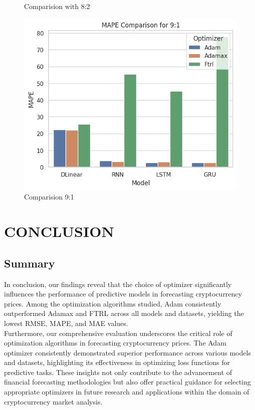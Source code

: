 \documentclass{ieeeojies}
\begin{document}
\begin{figure}[H]
\begin{minipage}{0.15\textwidth}
    \caption{Comparision with 8:2}
    \label{fig:2}
    \end{minipage}
    \hfill
    \begin{minipage}{0.15\textwidth}
    \centering
    \includegraphics[width=1\textwidth]{image/MAPE_91_eth.png}
    \caption{Comparision 9:1}
    \label{fig:1}
    \end{minipage}
\end{figure}

\section{CONCLUSION}


\subsection{Summary}
\par In conclusion, our findings reveal that the choice of optimizer significantly influences the performance of predictive models in forecasting cryptocurrency prices. Among the optimization algorithms studied, Adam consistently outperformed Adamax and FTRL across all models and datasets, yielding the lowest RMSE, MAPE, and MAE values.
\\
Furthermore, our comprehensive evaluation underscores the critical role of optimization algorithms in forecasting cryptocurrency prices. The Adam optimizer consistently demonstrated superior performance across various models and datasets, highlighting its effectiveness in optimizing loss functions for predictive tasks. These insights not only contribute to the advancement of financial forecasting methodologies but also offer practical guidance for selecting appropriate optimizers in future research and applications within the domain of cryptocurrency market analysis.
\end{document}
